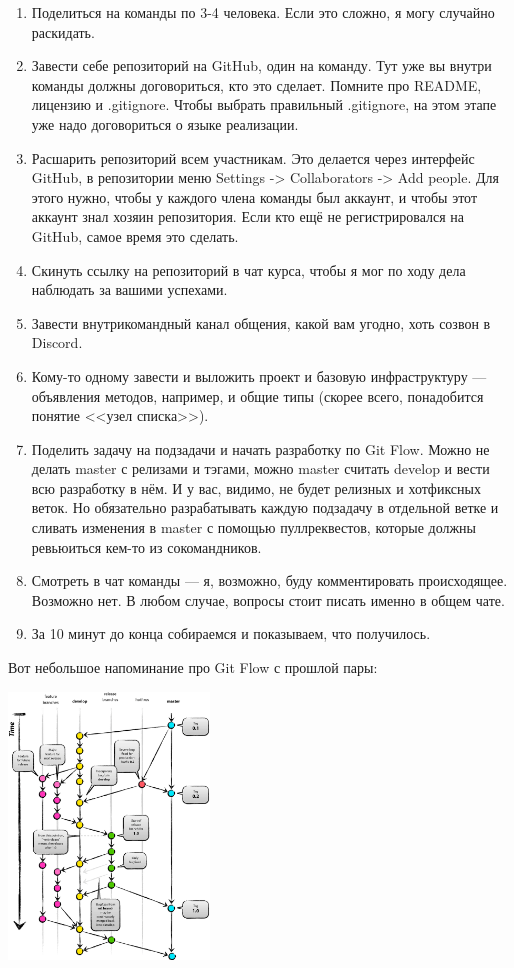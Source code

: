\documentclass{../text-style}
\begin{document}
\begin{enumerate}
    \item Поделиться на команды по 3-4 человека. Если это сложно, я могу случайно раскидать.
    \item Завести себе репозиторий на GitHub, один на команду. Тут уже вы внутри команды должны договориться, кто это сделает. Помните про README, лицензию и .gitignore. Чтобы выбрать правильный .gitignore, на этом этапе уже надо договориться о языке реализации.
    \item Расшарить репозиторий всем участникам. Это делается через интерфейс GitHub, в репозитории меню Settings -> Collaborators -> Add people. Для этого нужно, чтобы у каждого члена команды был аккаунт, и чтобы этот аккаунт знал хозяин репозитория. Если кто ещё не регистрировался на GitHub, самое время это сделать.
    \item Скинуть ссылку на репозиторий в чат курса, чтобы я мог по ходу дела наблюдать за вашими успехами.
    \item Завести внутрикомандный канал общения, какой вам угодно, хоть созвон в Discord.
    \item Кому-то одному завести и выложить проект и базовую инфраструктуру --- объявления методов, например, и общие типы (скорее всего, понадобится понятие <<узел списка>>).
    \item Поделить задачу на подзадачи и начать разработку по Git Flow. Можно не делать master с релизами и тэгами, можно master считать develop и вести всю разработку в нём. И у вас, видимо, не будет релизных и хотфиксных веток. Но обязательно разрабатывать каждую подзадачу в отдельной ветке и сливать изменения в master с помощью пуллреквестов, которые должны ревьюиться кем-то из сокомандников.
    \item Смотреть в чат команды --- я, возможно, буду комментировать происходящее. Возможно нет. В любом случае, вопросы стоит писать именно в общем чате.
    \item За 10 минут до конца собираемся и показываем, что получилось.
\end{enumerate}

Вот небольшое напоминание про Git Flow с прошлой пары:

\begin{center}
    \includegraphics[width=0.4\textwidth]{gitFlow.png}
\end{center}
\end{document}
